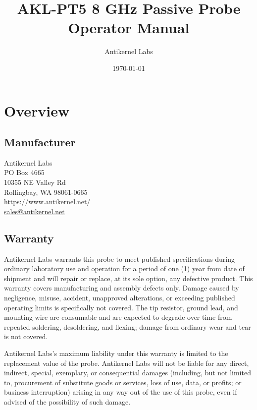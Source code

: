 \documentclass[11pt]{article}
\begin{document}
\title{AKL-PT5 8 GHz Passive Probe Operator Manual}
\author{Antikernel Labs}
\date{\today}

\maketitle
\thispagestyle{empty}

\pagebreak

\tableofcontents

\pagebreak

\section{Overview}

\subsection{Manufacturer}
Antikernel Labs \\
PO Box 4665 \\
10355 NE Valley Rd \\
Rollingbay, WA 98061-0665 \\
\href{https://www.antikernel.net/}{https://www.antikernel.net/} \\
\href{mailto:sales@antikernel.net}{sales@antikernel.net} \\

\subsection{Warranty}

Antikernel Labs warrants this probe to meet published specifications during ordinary laboratory use and operation for a
period of one (1) year from date of shipment and will repair or replace, at its sole option, any defective product.
This warranty covers manufacturing and assembly defects only. Damage caused by negligence, misuse, accident, unapproved
alterations, or exceeding published operating limits is specifically not covered. The tip resistor, ground lead, and
mounting wire are consumable and are expected to degrade over time from repeated soldering, desoldering, and flexing;
damage from ordinary wear and tear is not covered.

Antikernel Labs's maximum liability under this warranty is limited to the replacement value of the probe. Antikernel
Labs will not be liable for any direct, indirect, special, exemplary, or consequential damages (including, but not
limited to, procurement of substitute goods or services, loss of use, data, or profits; or business interruption)
arising in any way out of the use of this probe, even if advised of the possibility of such damage.
\end{document}
